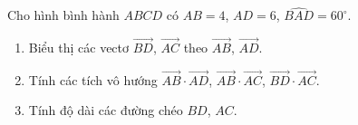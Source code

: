 \begin{bt}%
	Cho hình bình hành $ ABCD $ có $ AB=4 $, $ AD=6 $, $ \widehat{BAD} = 
	60^\circ $.
	\begin{enumerate}
		\item Biểu thị các vectơ $ \overrightarrow{BD} $, $ \overrightarrow{AC} $ theo $ \overrightarrow{AB} $, 
		$ \overrightarrow{AD} $.
		\item Tính các tích vô hướng $ \overrightarrow{AB} \cdot \overrightarrow{AD} $, $ \overrightarrow{AB} 
		\cdot \overrightarrow{AC}$, $ \overrightarrow{BD} \cdot \overrightarrow{AC}$.
		\item Tính độ dài các đường chéo $ BD $, $ AC $.
	\end{enumerate}
\end{bt}
